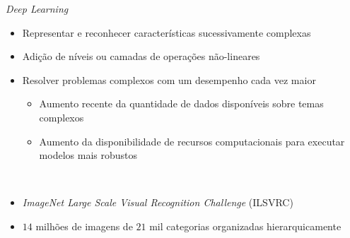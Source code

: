 %

\begin{frame}{\emph{Deep Learning}}
   \ \  \\[0.1cm]
   \begin{itemize}
     \item Representar e reconhecer características sucessivamente complexas
     \ \ \newline
     \item Adição de níveis ou camadas de operações não-lineares
     \ \ \newline
     \item Resolver problemas complexos com um desempenho cada vez maior
     \begin{itemize}
       \item Aumento recente da quantidade de dados disponíveis sobre temas complexos
       \item Aumento da disponibilidade de recursos computacionais para executar modelos mais robustos
     \end{itemize}
     \ \ \newline
     \item \emph{ImageNet Large Scale Visual Recognition Challenge} (ILSVRC)
     \item $14$ milhões de imagens de $21$ mil categorias organizadas hierarquicamente
   \end{itemize}
\end{frame}


